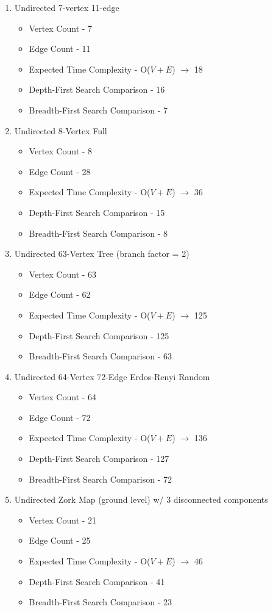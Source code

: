 \documentclass[letterpaper, 10pt,DIV=13]{scrartcl}
\numberwithin{equation}{section} %
\numberwithin{figure}{section} %
\numberwithin{table}{section} %
\begin{document}
\begin{enumerate}
   \item Undirected 7-vertex 11-edge
   \begin{itemize}
     \item Vertex Count - 7
     \item Edge Count - 11
     \item Expected Time Complexity - O($V + E$) $\rightarrow$ 18
     \item Depth-First Search Comparison - 16
     \item Breadth-First Search Comparison - 7
   \end{itemize}
   \item  Undirected 8-Vertex Full
   \begin{itemize}
     \item Vertex Count - 8
     \item Edge Count - 28
     \item Expected Time Complexity - O($V + E$) $\rightarrow$ 36  
     \item Depth-First Search Comparison - 15
     \item Breadth-First Search Comparison - 8
   \end{itemize}
      \item Undirected 63-Vertex Tree (branch factor = 2)
   \begin{itemize}
     \item Vertex Count - 63
     \item Edge Count - 62
     \item Expected Time Complexity - O($V + E$) $\rightarrow$ 125  
     \item Depth-First Search Comparison - 125
     \item Breadth-First Search Comparison - 63
   \end{itemize}
      \item Undirected 64-Vertex 72-Edge Erdos-Renyi Random
   \begin{itemize}
     \item Vertex Count - 64
     \item Edge Count - 72
     \item Expected Time Complexity - O($V + E$) $\rightarrow$ 136  
     \item Depth-First Search Comparison - 127
     \item Breadth-First Search Comparison - 72
   \end{itemize}
      \item Undirected Zork Map (ground level) w/ 3 disconnected components
   \begin{itemize}
     \item Vertex Count - 21
     \item Edge Count - 25
     \item Expected Time Complexity - O($V + E$) $\rightarrow$ 46  
     \item Depth-First Search Comparison - 41
     \item Breadth-First Search Comparison - 23
\end{itemize}
\end{enumerate}
\end{document}
